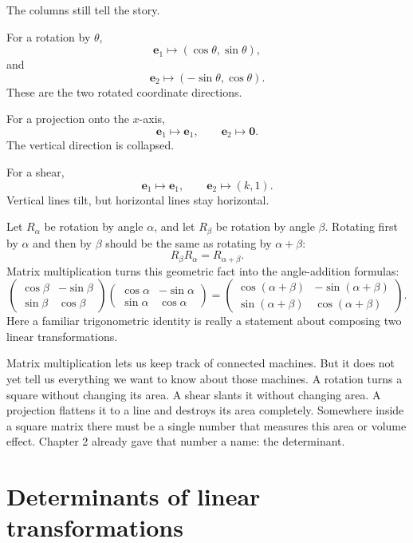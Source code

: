 The columns still tell the story.

For a rotation by \(\theta\),
\[
    \mathbf e_1\longmapsto(\cos\theta,\sin\theta),
\]
and
\[
    \mathbf e_2\longmapsto(-\sin\theta,\cos\theta).
\]
These are the two rotated coordinate directions.

For a projection onto the \(x\)-axis,
\[
    \mathbf e_1\longmapsto \mathbf e_1,
    \qquad
    \mathbf e_2\longmapsto \mathbf 0.
\]
The vertical direction is collapsed.

For a shear,
\[
    \mathbf e_1\longmapsto \mathbf e_1,
    \qquad
    \mathbf e_2\longmapsto(k,1).
\]
Vertical lines tilt, but horizontal lines stay horizontal.

\begin{example}
Let \(R_\alpha\) be rotation by angle \(\alpha\), and let \(R_\beta\) be rotation by angle
\(\beta\).  Rotating first by \(\alpha\) and then by \(\beta\) should be the same as rotating
by \(\alpha+\beta\):
\[
    R_\beta R_\alpha=R_{\alpha+\beta}.
\]
Matrix multiplication turns this geometric fact into the angle-addition formulas:
\[
\begin{pmatrix}
\cos\beta&-\sin\beta\\
\sin\beta&\cos\beta
\end{pmatrix}
\begin{pmatrix}
\cos\alpha&-\sin\alpha\\
\sin\alpha&\cos\alpha
\end{pmatrix}
=
\begin{pmatrix}
\cos(\alpha+\beta)&-\sin(\alpha+\beta)\\
\sin(\alpha+\beta)&\cos(\alpha+\beta)
\end{pmatrix}.
\]
Here a familiar trigonometric identity is really a statement about composing two
linear transformations.
\end{example}

Matrix multiplication lets us keep track of connected machines.  But it does not yet tell
us everything we want to know about those machines.  A rotation turns a square without
changing its area.  A shear slants it without changing area.  A projection flattens it to a
line and destroys its area completely.  Somewhere inside a square matrix there must be a
single number that measures this area or volume effect.  Chapter 2 already gave that
number a name: the determinant.

\section{Determinants of linear transformations}
\label{sec:3.4}


